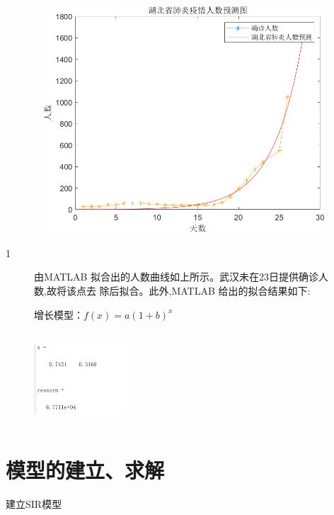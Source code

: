 \documentclass{article}
\begin{document}
\begin{figure}[h!]
                \centering
                \includegraphics[width=15cm,height=8.5cm]{2.png}
                \end{figure}
                1
\begin{figure}[h!]
由MATLAB 拟合出的人数曲线如上所示。武汉未在23日提供确诊人数,故将该点去
除后拟合。此外,MATLAB 给出的拟合结果如下:

增长模型：$f(x)=a(1+b)^x$

                \centering
                \includegraphics[width=3.5cm,height=3.5cm]{13.png}

                \end{figure}

\newpage

\section{模型的建立、求解}
建立SIR模型
\end{document}
